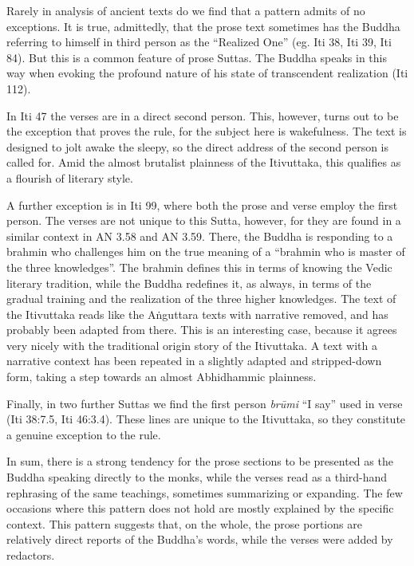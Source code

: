 \documentclass[12pt,openany]{book}%
\begin{document}
Rarely in analysis of ancient texts do we find that a pattern admits of no exceptions. It is true, admittedly, that the prose text sometimes has the Buddha referring to himself in third person as the “Realized One” (eg. Iti 38, Iti 39, Iti 84). But this is a common feature of prose Suttas. The Buddha speaks in this way when evoking the profound nature of his state of transcendent realization (Iti 112).

In Iti 47 the verses are in a direct second person. This, however, turns out to be the exception that proves the rule, for the subject here is wakefulness. The text is designed to jolt awake the sleepy, so the direct address of the second person is called for. Amid the almost brutalist plainness of the Itivuttaka, this qualifies as a flourish of literary style.

A further exception is in Iti 99, where both the prose and verse employ the first person. The verses are not unique to this Sutta, however, for they are found in a similar context in AN 3.58 and AN 3.59. There, the Buddha is responding to a brahmin who challenges him on the true meaning of a “brahmin who is master of the three knowledges”. The brahmin defines this in terms of knowing the Vedic literary tradition, while the Buddha redefines it, as always, in terms of the gradual training and the realization of the three higher knowledges. The text of the Itivuttaka reads like the \textsanskrit{Aṅguttara} texts with narrative removed, and has probably been adapted from there. This is an interesting case, because it agrees very nicely with the traditional origin story of the Itivuttaka. A text with a narrative context has been repeated in a slightly adapted and stripped-down form, taking a step towards an almost Abhidhammic plainness.

Finally, in two further Suttas we find the first person \emph{\textsanskrit{brūmi}} “I say” used in verse (Iti 38:7.5, Iti 46:3.4). These lines are unique to the Itivuttaka, so they constitute a genuine exception to the rule.

In sum, there is a strong tendency for the prose sections to be presented as the Buddha speaking directly to the monks, while the verses read as a third-hand rephrasing of the same teachings, sometimes summarizing or expanding. The few occasions where this pattern does not hold are mostly explained by the specific context. This pattern suggests that, on the whole, the prose portions are relatively direct reports of the Buddha’s words, while the verses were added by redactors.
\end{document}
